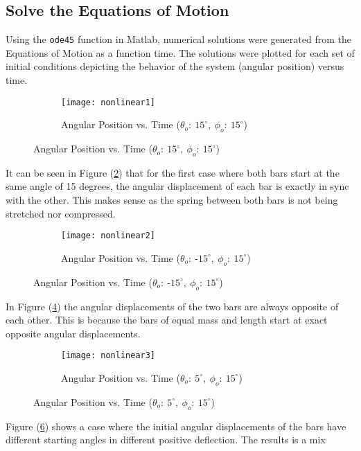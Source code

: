 \documentclass[12pt]{report}
\begin{document}
\begin{flushleft}
\section{Solve the Equations of Motion}
Using the \lstinline[style=Matlab-editor]!ode45! function in Matlab, numerical
solutions were generated from the Equations of Motion as a function time. The solutions
 were plotted for each set of initial conditions depicting the behavior of the
 system (angular position) versus time. \\
\begin{figure}[!ht]
  \caption{Analytical vs Numerical Solution Motion Behavior Plots}
  \label{fig:analyticals}
  \begin{subfigure}[t]{\textwidth}
  \texttt{[image: nonlinear1]}
  \caption{Angular Position vs. Time ($\theta_o:~15^\circ,~\phi_o:~15^\circ$)}
  \label{fig:+15+15}
\end{subfigure}
\end{figure}
It can be seen in Figure (\ref{fig:+15+15}) that for the first case where both bars start at the same
angle of 15 degrees, the angular displacement of each bar is exactly in sync with
the other. This makes sense as the spring between both bars is not being stretched
nor compressed.
~\\
\begin{figure}[!ht] \ContinuedFloat
\begin{subfigure}[t]{\textwidth}
  \texttt{[image: nonlinear2]}
  \caption{Angular Position vs. Time ($\theta_o:~\textrm{-}15^\circ,~\phi_o:~15^\circ$)}
  \label{fig:-15+15}
\end{subfigure}
\end{figure}
In Figure (\ref{fig:-15+15}) the angular displacements of the two bars are always opposite of each other.
This is because the bars of equal mass and length start at exact opposite angular displacements. \\
\newpage
\begin{figure}[!ht] \ContinuedFloat
\begin{subfigure}[t]{\textwidth}
  \texttt{[image: nonlinear3]}
  \caption{Angular Position vs. Time ($\theta_o:~5^\circ,~\phi_o:~15^\circ$)}
  \label{fig:+05+15}
\end{subfigure}
\end{figure}
Figure (\ref{fig:+05+15}) shows a case where the initial angular displacements of the bars have
different starting angles in different positive deflection. The results is a mix

\end{flushleft}
\end{document}
